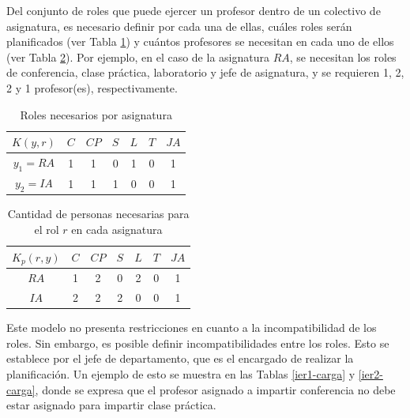 Del conjunto de roles que puede ejercer un profesor dentro de un colectivo de asignatura, es necesario definir por cada una de ellas, cuáles roles serán planificados (ver Tabla \ref{cpr-carga}) y cuántos profesores se necesitan en cada uno de ellos (ver Tabla \ref{cpnr-carga}). Por ejemplo, en el caso de la asignatura $RA$, se necesitan los roles de conferencia, clase práctica, laboratorio y jefe de asignatura, y se requieren 1, 2, 2 y 1 profesor(es), respectivamente.
\begin{table}[H]
	\centering
	\caption{Roles necesarios por asignatura}\label{cpr-carga}
	\begin{tabular}{|c|c|c|c|c|c|c|}
		\hline
		$K(y,r)$ & $C$ & $CP$& $S$ & $L$ & $T$ & $JA$ \\ \hline
		$y_1=RA$  	 &  1  &  1  &  0  &  1  &  0 &  1\\ \hline
		$y_2=IA$ 	 &  1  &  1  &  1  &  0  &  0 &  1\\ \hline
	\end{tabular}
\end{table}

\begin{table}[H]
	\centering
	\caption{Cantidad de personas necesarias para el rol $r$ en cada asignatura}\label{cpnr-carga}
	\begin{tabular}{|c|c|c|c|c|c|c|}
		\hline
		$K_{p}(r, y)$ & $C$ & $CP$& $S$& $L$& $T$ & $JA$ \\ \hline
		$RA$       &  1  &  2  &  0 &  2 &  0 &  1  \\ \hline
		$IA$       &  2  &  2  &  2 &  0 &  0  & 1 \\ \hline
	\end{tabular}
\end{table}





Este modelo no presenta restricciones en cuanto a la incompatibilidad de los roles. Sin embargo, es posible definir incompatibilidades entre los roles. Esto se establece por el jefe de departamento, que es el encargado de realizar la planificación. Un ejemplo de esto se muestra en las Tablas \ref{ier1-carga} y \ref{ier2-carga}, donde se expresa que el profesor asignado a impartir conferencia no debe estar asignado para impartir clase práctica.

